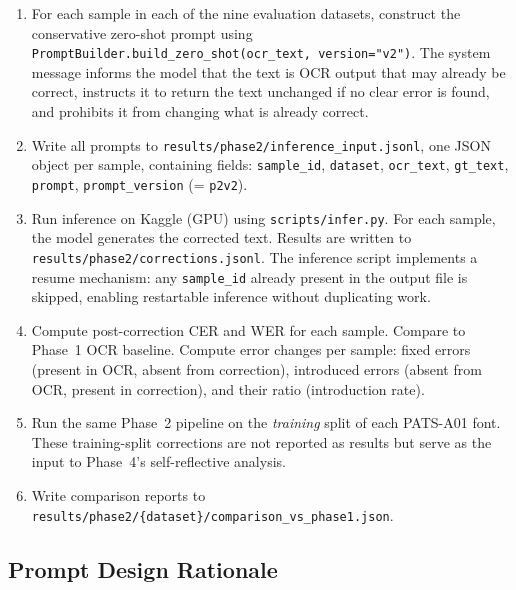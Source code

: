 \begin{enumerate}
  \item For each sample in each of the nine evaluation datasets, construct the
        conservative zero-shot prompt using
        \texttt{PromptBuilder.build\_zero\_shot(ocr\_text, version="v2")}.
        The system message informs the model that the text is OCR output that
        may already be correct, instructs it to return the text unchanged if
        no clear error is found, and prohibits it from changing what is
        already correct.

  \item Write all prompts to
        \texttt{results/phase2/inference\_input.jsonl}, one JSON object per
        sample, containing fields: \texttt{sample\_id}, \texttt{dataset},
        \texttt{ocr\_text}, \texttt{gt\_text}, \texttt{prompt},
        \texttt{prompt\_version} (= \texttt{p2v2}).

  \item Run inference on Kaggle (GPU) using \texttt{scripts/infer.py}.
        For each sample, the model generates the corrected text.
        Results are written to \texttt{results/phase2/corrections.jsonl}.
        The inference script implements a resume mechanism: any
        \texttt{sample\_id} already present in the output file is skipped,
        enabling restartable inference without duplicating work.

  \item Compute post-correction CER and WER for each sample.
        Compare to Phase~1 OCR baseline.
        Compute error changes per sample: fixed errors (present in OCR,
        absent from correction), introduced errors (absent from OCR,
        present in correction), and their ratio (introduction rate).

  \item Run the same Phase~2 pipeline on the \emph{training} split of each
        PATS-A01 font. These training-split corrections are not reported as
        results but serve as the input to Phase~4's self-reflective analysis.

  \item Write comparison reports to
        \texttt{results/phase2/\{dataset\}/comparison\_vs\_phase1.json}.
\end{enumerate}

\subsection{Prompt Design Rationale}
\label{subsec:phase2_rationale}


